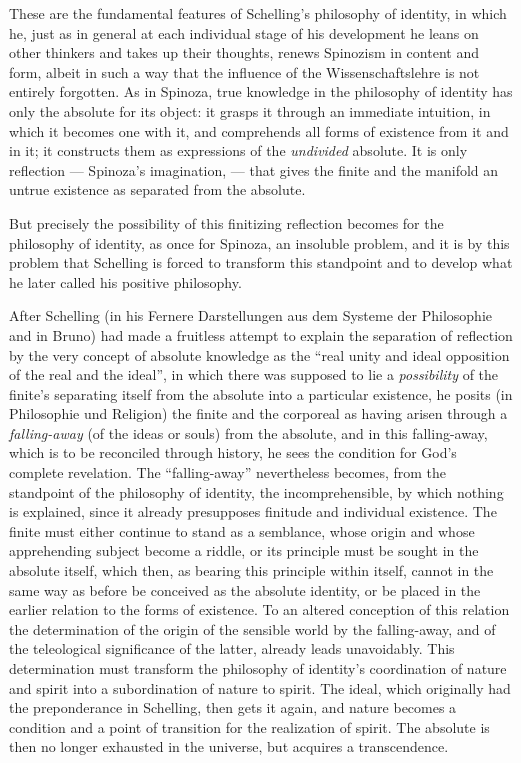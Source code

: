 These are the fundamental features of Schelling's philosophy of identity,
in which he, just as in general at each individual stage of his
development he leans on other thinkers and takes up their thoughts,
renews Spinozism in content and form, albeit in such a way that the
influence of the Wissenschaftslehre is not entirely forgotten. As in
Spinoza, true knowledge in the philosophy of identity has only the
absolute for its object: it grasps it through an immediate intuition, in
which it becomes one with it, and comprehends all forms of existence from
it and in it; it constructs them as expressions of the \emph{undivided}
absolute. It is only reflection --- Spinoza's imagination, ---
that gives the finite and the manifold an untrue existence as separated
from the absolute.

But precisely the possibility of this finitizing reflection becomes for
the philosophy of identity, as once for Spinoza, an insoluble problem,
and it is by this problem that Schelling is forced to transform this
standpoint and to develop what he later called his positive philosophy.

After Schelling (in his Fernere Darstellungen aus dem Systeme der
Philosophie and in Bruno) had made a fruitless attempt to explain the
separation of reflection by the very concept of absolute knowledge as the
``real unity and ideal opposition of the real and the ideal'', in which
there was supposed to lie a \emph{possibility} of the finite's separating
itself from the absolute into a particular existence, he posits (in
Philosophie und Religion) the finite and the corporeal as having arisen
through a \emph{falling-away} (of the ideas or souls) from the absolute,
and in this falling-away, which is to be reconciled through history, he
sees the condition for God's complete revelation. The ``falling-away''
nevertheless becomes, from the standpoint of the philosophy of identity,
the incomprehensible, by which nothing is explained, since it already
presupposes finitude and individual existence. The finite must either
continue to stand as a semblance, whose origin and whose apprehending
subject become a riddle, or its principle must be sought in the absolute
itself, which then, as bearing this principle within itself, cannot in
the same way as before be conceived as the absolute identity, or be
placed in the earlier relation to the forms of existence. To an altered
conception of this relation the determination of the origin of the
sensible world by the falling-away, and of the teleological significance
of the latter, already leads unavoidably. This determination must
transform the philosophy of identity's coordination of nature and spirit
into a subordination of nature to spirit. The ideal, which originally had
the preponderance in Schelling, then gets it again, and nature becomes a
condition and a point of transition for the realization of spirit. The
absolute is then no longer exhausted in the universe, but acquires a
transcendence.

